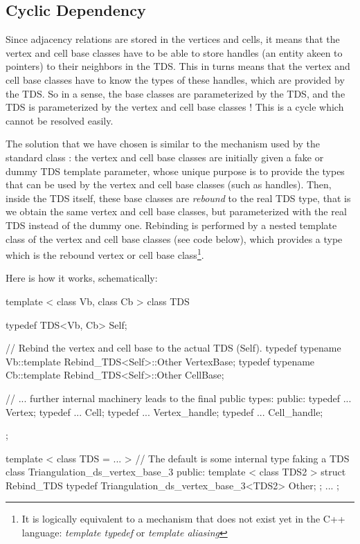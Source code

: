 \subsection{Cyclic Dependency}
\label{tds3-cyclic}

Since adjacency relations are stored in the vertices and cells, it means that
the vertex and cell base classes have to be able to store handles (an entity
akeen to pointers) to their neighbors in the TDS.  This in turns means that the
vertex and cell base classes have to know the types of these handles, which are
provided by the TDS.  So in a sense, the base classes are parameterized by the
TDS, and the TDS is parameterized by the vertex and cell base classes !
This is a cycle which cannot be resolved easily.

The solution that we have chosen is similar to the mechanism used by the
standard class : the vertex and cell base classes are
initially given a fake or dummy TDS template parameter, whose unique purpose
is to provide the types that can be used by the vertex and cell base classes
(such as handles).  Then, inside the TDS itself, these base classes are
\textit{rebound} to the real TDS type, that is we obtain the same vertex
and cell base classes, but parameterized with the real TDS instead of the dummy
one.  Rebinding is performed by a nested template class of the vertex and cell
base classes (see code below), which provides a type which is the rebound
vertex or cell base class\footnote{It is logically equivalent to a mechanism
that does not exist yet in the C++ language: \textit{template typedef} or
\textit{template aliasing}}.

Here is how it works, schematically:

\begin{ccExampleCode}
template < class Vb, class Cb >
class TDS
{
  typedef TDS<Vb, Cb>    Self;

  // Rebind the vertex and cell base to the actual TDS (Self).
  typedef typename Vb::template Rebind_TDS<Self>::Other  VertexBase;
  typedef typename Cb::template Rebind_TDS<Self>::Other  CellBase;

  // ... further internal machinery leads to the final public types:
public:
  typedef ...  Vertex;
  typedef ...  Cell;
  typedef ...  Vertex_handle;
  typedef ...  Cell_handle;
};

template < class TDS = ... >  // The default is some internal type faking a TDS
class Triangulation_ds_vertex_base_3
{
public:
  template < class TDS2 >
  struct Rebind_TDS {
    typedef Triangulation_ds_vertex_base_3<TDS2>    Other;
  };
...
};
\end{ccExampleCode}


